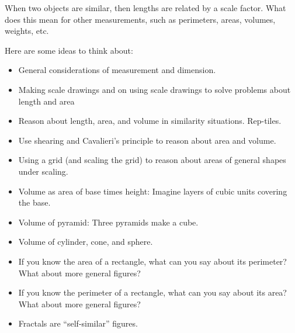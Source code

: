 
When two objects are similar, then lengths are related by a scale factor.  What does this mean for other measurements, such as perimeters, areas, volumes, weights, etc.  

Here are some ideas to think about:  

\begin{itemize}\itemsep-2pt
\item General considerations of measurement and dimension.  
\item Making scale drawings and on using scale drawings to solve problems about length and area
\item Reason about length, area, and volume in similarity situations.  Rep-tiles.    
\item Use shearing and Cavalieri's principle to reason about area and volume.  
\item Using a grid (and scaling the grid) to reason about areas of general shapes under scaling.  
\item Volume as area of base times height:  Imagine layers of cubic units covering the base.
\item Volume of pyramid:  Three pyramids make a cube.  
\item Volume of cylinder, cone, and sphere.
\item If you know the area of a rectangle, what can you say about its perimeter?  What about more general figures?  
\item If you know the perimeter of a rectangle, what can you say about its area?  What about more general figures? 
\item Fractals are ``self-similar'' figures.  
\end{itemize}

 


